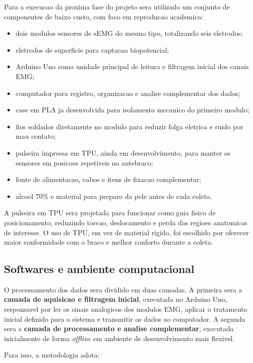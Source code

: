 \documentclass[12pt,oneside,a4paper,brazilian]{abntex2}
\begin{document}
Para a execucao da proxima fase do projeto sera utilizado um conjunto de componentes de baixo custo, com foco em reproducao academica:

\begin{itemize}
  \item dois modulos sensores de sEMG do mesmo tipo, totalizando seis eletrodos;
  \item eletrodos de superficie para captacao biopotencial;
  \item Arduino Uno como unidade principal de leitura e filtragem inicial dos canais EMG;
  \item computador para registro, organizacao e analise complementar dos dados;
  \item case em PLA ja desenvolvida para isolamento mecanico do primeiro modulo;
  \item fios soldados diretamente no modulo para reduzir folga eletrica e ruido por mau contato;
  \item pulseira impressa em TPU, ainda em desenvolvimento, para manter os sensores em posicoes repetiveis no antebraco;
  \item fonte de alimentacao, cabos e itens de fixacao complementar;
  \item alcool 70\% e material para preparo da pele antes de cada coleta.
\end{itemize}

A pulseira em TPU sera projetada para funcionar como guia fisico de posicionamento, reduzindo torcao, deslocamento e perda das regioes anatomicas de interesse. O uso de TPU, em vez de material rigido, foi escolhido por oferecer maior conformidade com o braco e melhor conforto durante a coleta.

\subsection{Softwares e ambiente computacional}

O processamento dos dados sera dividido em duas camadas. A primeira sera a \textbf{camada de aquisicao e filtragem inicial}, executada no Arduino Uno, responsavel por ler os sinais analogicos dos modulos EMG, aplicar o tratamento inicial definido para o sistema e transmitir os dados ao computador. A segunda sera a \textbf{camada de processamento e analise complementar}, executada inicialmente de forma \textit{offline} em ambiente de desenvolvimento mais flexivel.

Para isso, a metodologia adota:
\end{document}
